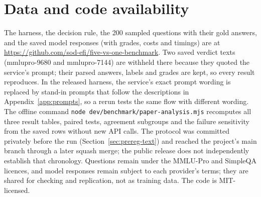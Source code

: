 \documentclass[11pt]{article}
\begin{document}
\section*{Data and code availability}
\sloppy The harness, the decision rule, the 200 sampled questions with their gold answers, and the saved model responses (with grades, costs and timings) are at \url{https://github.com/sod-efi/five-vs-one-benchmark}. Two saved verdict texts (mmlupro-9680 and mmlupro-7144) are withheld there because they quoted the service's prompt; their parsed answers, labels and grades are kept, so every result reproduces. In the released harness, the service's exact prompt wording is replaced by stand-in prompts that follow the descriptions in Appendix~\ref{app:prompts}, so a rerun tests the same flow with different wording. The offline command \texttt{node dev/benchmark/paper-analysis.mjs} recomputes all three result tables, paired tests, agreement subgroups and the failure sensitivity from the saved rows without new API calls. The protocol was committed privately before the run (Section~\ref{sec:prereg-text}) and reached the project's main branch through a later squash merge; the public release does not independently establish that chronology. Questions remain under the MMLU-Pro and SimpleQA licences, and model responses remain subject to each provider's terms; they are shared for checking and replication, not as training data. The code is MIT-licensed.
\end{document}

